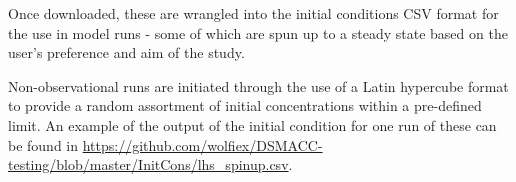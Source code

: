 Once downloaded, these are wrangled into the initial conditions CSV format for the use in model runs - some of which are spun up to a steady state based on the user's preference and aim of the study.

Non-observational runs are initiated through the use of a Latin hypercube format to provide a random assortment of initial concentrations within a pre-defined limit. An example of the output of the initial condition for one run of these can be found in \url{https://github.com/wolfiex/DSMACC-testing/blob/master/InitCons/lhs_spinup.csv}.



